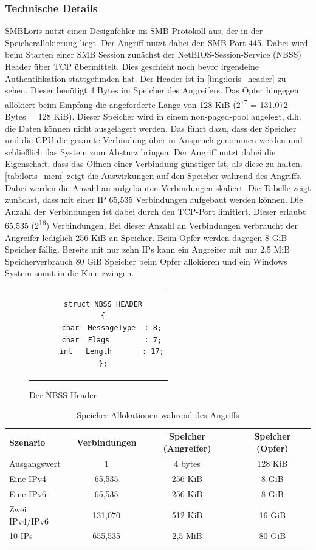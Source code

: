\documentclass{AIFB_ITI_Crypto_Seminar}
\begin{document}
\subsubsection{Technische Details}
SMBLoris nutzt einen Designfehler im SMB-Protokoll aus, der in der Speicherallokierung liegt. Der Angriff nutzt dabei den SMB-Port 445. Dabei wird beim Starten einer SMB Session zunächst der NetBIOS-Session-Service (NBSS) Header über TCP übermittelt. Dies geschieht noch bevor irgendeine Authentifikation stattgefunden hat. Der Header ist in \autoref{img:loris_header} zu sehen. Dieser benötigt 4 Bytes im Speicher des Angreifers. Das Opfer hingegen allokiert beim Empfang die angeforderte Länge von 128 KiB (2\textsuperscript{17} = 131.072-Bytes = 128 KiB). Dieser Speicher wird in einem non-paged-pool angelegt, d.h. die Daten können nicht ausgelagert werden. Das führt dazu, dass der Speicher und die CPU die gesamte Verbindung über in Anspruch genommen werden und schließlich das System zum Absturz bringen. Der Angriff nutzt dabei die Eigenschaft, dass das Öffnen einer Verbindung günstiger ist, als diese zu halten. \autoref{tab:loris_mem} zeigt die Auswirkungen auf den Speicher während des Angriffs. Dabei werden die Anzahl an aufgebauten Verbindungen skaliert. Die Tabelle zeigt zunächst, dass mit einer IP 65,535 Verbindungen aufgebaut werden können. Die Anzahl der Verbindungen ist dabei durch den TCP-Port limitiert. Dieser erlaubt 65,535 (2\textsuperscript{16}) Verbindungen. Bei dieser Anzahl an Verbindungen verbraucht der Angreifer lediglich 256 KiB an Speicher. Beim Opfer werden dagegen 8 GiB Speicher fällig. Bereits mit nur zehn IPs kann ein Angreifer mit nur 2,5 MiB Speicherverbrauch 80 GiB Speicher beim Opfer allokieren und ein Windows System somit in die Knie zwingen.
\begin{figure}
  \centering  
  \begin{tabular}{c}
  \begin{lstlisting}
  struct NBSS_HEADER
  {
      char  MessageType  : 8;
      char  Flags        : 7;
      int   Length       : 17;
  };
  \end{lstlisting}
  \end{tabular}
  \caption{Der NBSS Header \cite{loris}}
  \label{img:loris_header}
\end{figure} 

\begin{table}
\centering
\begin{tabular}{|l|c|c|c|}
\hline
Szenario & Verbindungen & Speicher (Angreifer) & Speicher (Opfer)  \\ \hline
Ausgangswert & 1 & 4 bytes & 128 KiB \\ \hline
Eine IPv4 & 65,535 & 256 KiB & 8 GiB \\ \hline
Eine IPv6 & 65,535 & 256 KiB & 8 GiB \\ \hline
Zwei IPv4/IPv6 & 131,070 & 512 KiB & 16 GiB \\ \hline
10 IPs & 655,535 & 2,5 MiB & 80 GiB \\ \hline
\end{tabular}
\caption{\label{tab:loris_mem} Speicher Allokationen während des Angriffs \cite{loris}}
\end{table}
\end{document}
